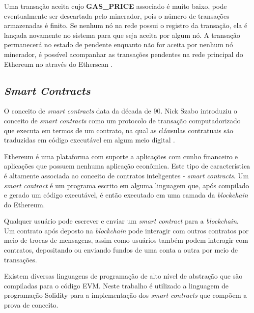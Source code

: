 \documentclass[tcc,capa]{texufpel}
\begin{document}
	Uma transação aceita cujo \textbf{GAS\_PRICE} associado é muito baixo, pode eventualmente ser descartada pelo minerador, pois o número de transações armazenadas é finito. Se nenhum nó na rede possui o registro da transação, ela é lançada novamente no sistema para que seja aceita por algum nó. A transação permanecerá no estado de pendente enquanto não for aceita por nenhum nó minerador, é possível acompanhar as transações pendentes na rede principal do Ethereum no através do Etherscan \cite{team2017etherscan}.

	
	
	
	\subsection{\textit{Smart Contracts}}
	
	O conceito de \textit{smart contracts} data da década de 90. Nick Szabo introduziu o conceito de \textit{smart contracts} como um protocolo de transação computadorizado que executa em termos de um contrato, na qual as cláusulas contratuais são traduzidas em código executável em algum meio digital \cite{szabo1997}.
	
	Ethereum é uma plataforma com suporte a aplicações com cunho financeiro e aplicações que possuem nenhuma aplicação econômica. Este tipo de característica é altamente associada ao conceito de contratos inteligentes - \textit{smart contracts}. Um \textit{smart contract} é um programa escrito em alguma linguagem que, após compilado e gerado um código executável, é então executado em uma camada da \textit{blockchain} do Ethereum.
	
	Qualquer usuário pode escrever e enviar um \textit{smart contract} para a \textit{blockchain}. Um contrato após deposto na \textit{blockchain} pode interagir com outros contratos por meio de trocas de mensagens, assim como usuários também podem interagir com contratos, depositando ou enviando fundos de uma conta a outra por meio de transações.
	
	Existem diversas linguagens de programação de alto nível de abstração que são compiladas para o código EVM. Neste trabalho é utilizado a linguagem de programação Solidity \cite{dannen2017introducing} para a implementação dos \textit{smart contracts} que compõem a prova de conceito.
\end{document}
